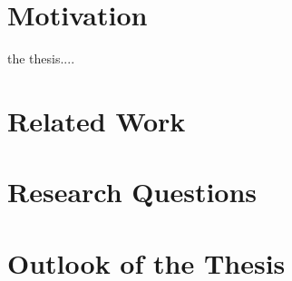 \section{Motivation} \label{1,1}
the thesis....

\section{Related Work}

\section{Research Questions}

\section{Outlook of the Thesis}
